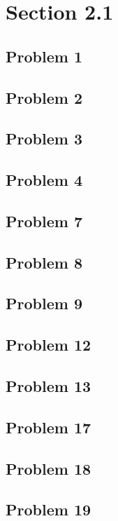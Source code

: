 \documentclass[11pt]{article}
\begin{document}
\section*{Section 2.1}
\subsection*{Problem 1}
\subsection*{Problem 2}
\subsection*{Problem 3}
\subsection*{Problem 4}
\subsection*{Problem 7}
\subsection*{Problem 8}
\subsection*{Problem 9}
\subsection*{Problem 12}
\subsection*{Problem 13}
\subsection*{Problem 17}
\subsection*{Problem 18}
\subsection*{Problem 19}
\end{document}
